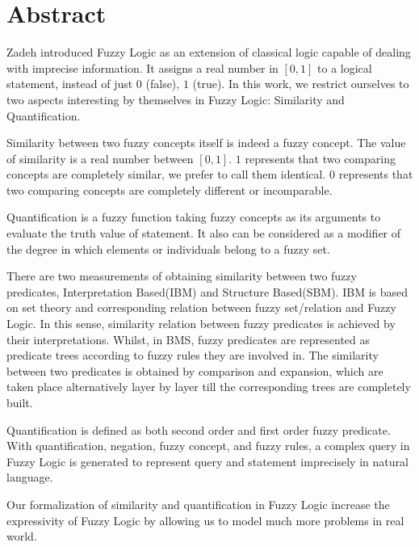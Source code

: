 \documentclass[Thesis.tex]{subfiles}
\begin{document}
\chapter*{\centering Abstract}
\label{chap:Abstract}

Zadeh introduced Fuzzy Logic as an extension of classical logic capable of dealing with imprecise information. It assigns a real number in $[0,1]$ to a logical statement, instead of just $0$ (false), $1$ (true).  In this work, we restrict ourselves to two aspects interesting by themselves in Fuzzy Logic: Similarity and Quantification.

Similarity between two fuzzy concepts itself is indeed a fuzzy concept. The value of similarity is
a real number between $[0,1]$. $1$ represents that two comparing concepts are completely similar, we prefer to call them identical. $0$ represents that two comparing concepts are completely different or incomparable. 

Quantification is a fuzzy function taking fuzzy concepts as its arguments to evaluate the truth value of statement. It also can be considered as a modifier of the degree in which elements or individuals belong to a fuzzy set.

There are two measurements of obtaining similarity between two fuzzy predicates, Interpretation Based(IBM) and Structure Based(SBM). IBM is based on set theory and corresponding relation between fuzzy set/relation and Fuzzy Logic.  In this sense, similarity relation between fuzzy predicates is achieved by their interpretations. Whilst, in BMS, fuzzy predicates are represented as predicate trees according to fuzzy rules they are involved in. The similarity between two predicates is obtained by comparison and expansion, which are taken place alternatively layer by layer till the corresponding trees are completely built.

Quantification is defined as both second order and first order fuzzy predicate. With quantification, negation, fuzzy concept, and fuzzy rules, a complex query in Fuzzy Logic is generated to represent query and statement imprecisely in natural language. 

Our formalization of similarity and quantification in Fuzzy Logic increase the expressivity of Fuzzy Logic by allowing us to model much more problems in real world.\\ 
\end{document}

